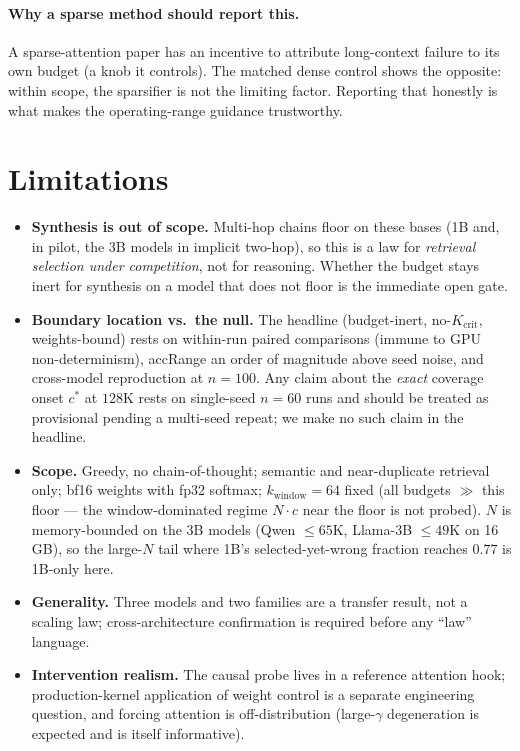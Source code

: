 \documentclass[11pt]{article}
\newcommand{\Kcrit}{K_{\mathrm{crit}}}
\begin{document}
\paragraph{Why a sparse method should report this.}
A sparse-attention paper has an incentive to attribute long-context failure to its
own budget (a knob it controls). The matched dense control shows the opposite:
within scope, the sparsifier is not the limiting factor. Reporting that honestly is
what makes the operating-range guidance trustworthy.

\section{Limitations}
\label{sec:limits}

\begin{itemize}
\item \textbf{Synthesis is out of scope.} Multi-hop chains floor on these bases
(1B and, in pilot, the 3B models in implicit two-hop), so this is a law for
\emph{retrieval selection under competition}, not for reasoning. Whether the budget
stays inert for synthesis on a model that does not floor is the immediate open gate.
\item \textbf{Boundary location vs.\ the null.} The headline (budget-inert,
no-$\Kcrit$, weights-bound) rests on within-run paired comparisons (immune to GPU
non-determinism), accRange an order of magnitude above seed noise, and cross-model
reproduction at $n{=}100$. Any claim about the \emph{exact} coverage onset $c^\ast$
at $128\mathrm{K}$ rests on single-seed $n{=}60$ runs and should be treated as
provisional pending a multi-seed repeat; we make no such claim in the headline.
\item \textbf{Scope.} Greedy, no chain-of-thought; semantic and near-duplicate
retrieval only; bf16 weights with fp32 softmax; $k_{\mathrm{window}}{=}64$ fixed
(all budgets $\gg$ this floor --- the window-dominated regime $N\!\cdot\!c$ near the
floor is not probed). $N$ is memory-bounded on the 3B models (Qwen $\le 65\mathrm{K}$,
Llama-3B $\le 49\mathrm{K}$ on 16\,GB), so the large-$N$ tail where 1B's
selected-yet-wrong fraction reaches $0.77$ is 1B-only here.
\item \textbf{Generality.} Three models and two families are a transfer result, not a
scaling law; cross-architecture confirmation is required before any ``law'' language.
\item \textbf{Intervention realism.} The causal probe lives in a reference attention
hook; production-kernel application of weight control is a separate engineering
question, and forcing attention is off-distribution (large-$\gamma$ degeneration is
expected and is itself informative).
\end{itemize}
\end{document}
